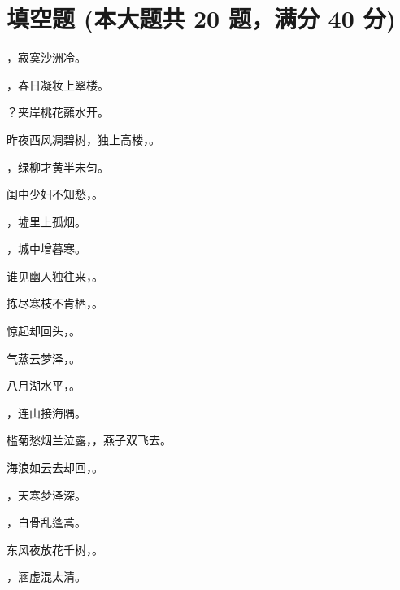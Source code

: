 \documentclass[12pt, a4paper, addpoints]{exam}
\begin{document}
\section{\normalsize{填空题 (本大题共 20 题，满分 40 分)}}
\hspace{1.5cm}
\begin{questions}
\question[2] \uline{\qquad\qquad\qquad\qquad}，寂寞沙洲冷。

\question[2] \uline{\qquad\qquad\qquad\qquad}，春日凝妆上翠楼。

\question[2] \uline{\qquad\qquad\qquad\qquad}？夹岸桃花蘸水开。

\question[2] 昨夜西风凋碧树，独上高楼，\uline{\qquad\qquad\qquad\qquad}。

\question[2] \uline{\qquad\qquad\qquad\qquad}，绿柳才黄半未匀。

\question[2] 闺中少妇不知愁，\uline{\qquad\qquad\qquad\qquad}。

\question[2] \uline{\qquad\qquad\qquad\qquad}，墟里上孤烟。

\question[2] \uline{\qquad\qquad\qquad\qquad}，城中增暮寒。

\question[2] 谁见幽人独往来，\uline{\qquad\qquad\qquad\qquad}。

\question[2] 拣尽寒枝不肯栖，\uline{\qquad\qquad\qquad\qquad}。

\question[2] 惊起却回头，\uline{\qquad\qquad\qquad\qquad}。

\question[2] 气蒸云梦泽，\uline{\qquad\qquad\qquad\qquad}。

\question[2] 八月湖水平，\uline{\qquad\qquad\qquad\qquad}。

\question[2] \uline{\qquad\qquad\qquad\qquad}，连山接海隅。

\question[2] 槛菊愁烟兰泣露，\uline{\qquad\qquad\qquad\qquad}，燕子双飞去。

\question[2] 海浪如云去却回，\uline{\qquad\qquad\qquad\qquad}。

\question[2] \uline{\qquad\qquad\qquad\qquad}，天寒梦泽深。

\question[2] \uline{\qquad\qquad\qquad\qquad}，白骨乱蓬蒿。

\question[2] 东风夜放花千树，\uline{\qquad\qquad\qquad\qquad}。

\question[2] \uline{\qquad\qquad\qquad\qquad}，涵虚混太清。

\end{questions}
\end{document}
